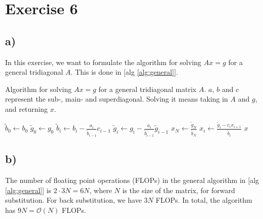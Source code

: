 \documentclass[11pt]{article} %
\begin{document}
\section*{Exercise 6}

\subsection*{a)}

In this exercise, we want to formulate the algorithm for solving $Ax = g$ for a general tridiagonal $A$. This is done in [alg \ref{alg:general}].

\begin{algorithm}
\caption{Algorithm for solving $Ax = g$ for a general tridiagonal matrix $A$. $a$, $b$ and $c$ represent the sub-, main- and superdiagonal. Solving it means taking in $A$ and $g$, and returning $x$.}
\begin{algorithmic}[0]
    \State $\tilde{b}_0 \gets b_0$
    \State $\tilde{g}_0 \gets g_0$
        \State $\tilde{b}_i \gets b_i - \frac{a_i}{\tilde{b}_{i-1}} c_{i-1}$
        \State $\tilde{g}_i \gets g_i - \frac{a_i}{\tilde{b}_{i-1}} \tilde{g}_{i-1}$
    \EndFor
    \State $x_N \gets \frac{\tilde{g}_N}{\tilde{b}_N}$
        \State $x_i \gets \frac{\tilde{g}_i - c_i x_{i+1}}{\tilde{b}_i}$
    \EndFor
    \State \Return $x$
\EndProcedure
\end{algorithmic}
\label{alg:general}
\end{algorithm}

\subsection*{b)}
The number of floating point operations (FLOPs) in the general algorithm in [alg \ref{alg:general}] is $2 \cdot 3 N = 6N$, where $N$ is the size of the matrix, for forward substitution. For back substitution, we have $3 N$ FLOPs. In total, the algorithm has $9N = \mathcal{O}(N)$ FLOPs. 
\end{document}
